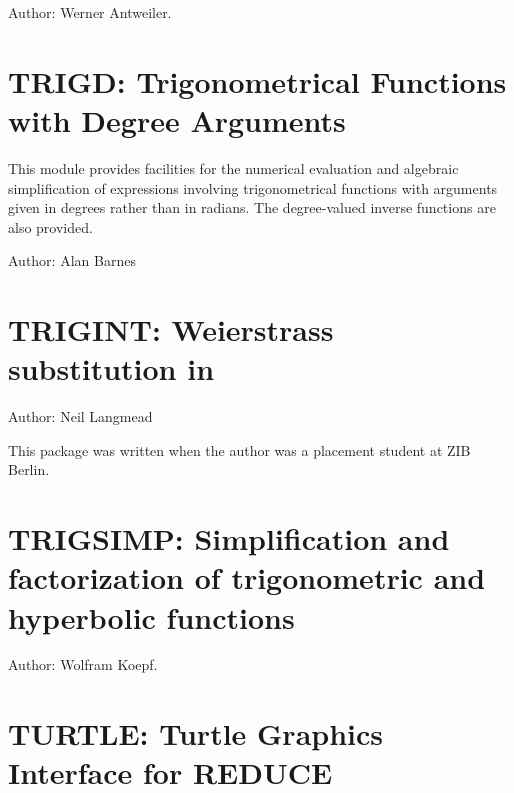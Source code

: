 Author: Werner Antweiler.

\newpage

\section{TRIGD: Trigonometrical Functions \protect\\ with Degree Arguments}

This module provides facilities for the numerical evaluation and
algebraic simplification of expressions involving trigonometrical
functions with arguments given in degrees rather than in radians. The
degree-valued inverse functions are also provided.

Author: Alan Barnes


\newpage

\section{TRIGINT: Weierstrass substitution in \REDUCE}

Author: Neil Langmead

This package was written when the author was a placement student at ZIB Berlin.



\section{TRIGSIMP: Simplification and factorization of trigonometric
and hyperbolic functions} 

\label{TRIGSIMP}

\iffalse
TRIGSIMP is a useful tool for all kinds of trigonometric and hyperbolic
simplification and factorization.  There are three procedures included in
TRIGSIMP: trigsimp, trigfactorize and triggcd.  The first is for finding
simplifications of trigonometric or hyperbolic expressions with many
options, the second for factorizing them and the third for finding the
greatest common divisor of two trigonometric or hyperbolic polynomials.
\fi
Author: Wolfram Koepf.


\newpage

\section{TURTLE: Turtle Graphics Interface for REDUCE}

